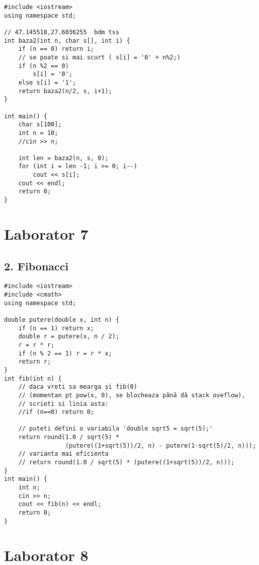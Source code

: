 \documentclass[11pt]{article}
\begin{document}
\begin{verbatim}
#include <iostream>
using namespace std;

// 47.145518,27.6036255  bdm tss
int baza2(int n, char s[], int i) {
    if (n == 0) return i;
    // se poate si mai scurt ( s[i] = '0' + n%2;)
    if (n %2 == 0)
        s[i] = '0';
    else s[i] = '1';
    return baza2(n/2, s, i+1);
} 

int main() {
    char s[100];
    int n = 10;
    //cin >> n;

    int len = baza2(n, s, 0);
    for (int i = len -1; i >= 0; i--)
        cout << s[i];
    cout << endl;
    return 0;
}

\end{verbatim}
\pagebreak

\section*{Laborator 7}
\label{sec:orge29d6a0}
\subsection*{2. Fibonacci}
\label{sec:org86624a6}
\begin{verbatim}
#include <iostream>
#include <cmath>
using namespace std;

double putere(double x, int n) {
    if (n == 1) return x;
    double r = putere(x, n / 2);
    r = r * r;
    if (n % 2 == 1) r = r * x;
    return r;
}
int fib(int n) {
    // daca vreti sa mearga și fib(0) 
    // (momentan pt pow(x, 0), se blocheaza până dă stack oveflow),
    // scrieti si linia asta:
    //if (n==0) return 0;

    // puteti defini o variabila 'double sqrt5 = sqrt(5);'
    return round(1.0 / sqrt(5) * 
                 (putere((1+sqrt(5))/2, n) - putere(1-sqrt(5)/2, n)));
    // varianta mai eficienta
    // return round(1.0 / sqrt(5) * (putere((1+sqrt(5))/2, n)));
}
int main() {
    int n;
    cin >> n;
    cout << fib(n) << endl;
    return 0;
}
\end{verbatim}

\pagebreak
\section*{Laborator 8}
\label{sec:org9ba5cd7}
\end{document}

